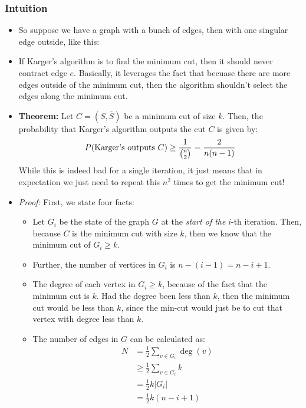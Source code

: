\subsubsection{Intuition}
\begin{itemize}
	\item So suppose we have a graph with a bunch of edges, then with one singular edge outside, like this:
	\item If Karger's algorithm is to find the minimum cut, then it should never contract edge \( e \). Basically, it leverages
		 the fact that becuase there are more edges outside of the minimum cut, then the algorithm shouldn't select the edges 
		 along the minimum cut. 
	 \item \textbf{Theorem:} Let  \( C = (S, \overline S) \) be a minimum cut of size \( k \). Then, the probability that 
		 Karger's algorithm outputs the cut \( C \) is given by:
		 \[
			 P(\text{Karger's outputs \( C \)}) \ge \frac{1}{{n \choose 2}} = \frac{2}{n(n-1)}
		 \] 
		 While this is indeed bad for a single iteration, it just means that in expectation we just need to repeat this 
		 \( n^2 \) times to get the minimum cut!
	 \item \textit{Proof:} First, we state four facts:
		 \begin{itemize}
		 	\item Let \( G_i \) be the state of the graph \( G \) at the \textit{start of the} \( i \)-th iteration. Then, because 
		 \( C \) is the minimum cut with size \( k \), then we know that the minimum cut of \( G_i \ge k \). 
			\item Further, the number of vertices in \( G_i  \) is \( n - (i - 1) = n-i+1\). 
			\item The degree of each vertex in \( G_i \ge  k \), because of the fact that the minimum cut is \( k \). Had 
				the degree been less than \( k \), then the minimum cut would be less than \( k \), since the min-cut 
				would just be to cut that vertex with degree less than \( k \). 
			\item The number of edges in \( G \) can be calculated as:
				\begin{align*}
					N &= \frac{1}{2}\sum_{v \in G_i} \deg(v)\\
					  &\ge \frac{1}{2}\sum_{v \in G_i} k\\
					  &= \frac{1}{2}k |G_i| \\
					  &= \frac{1}{2}k(n-i+1) 
				\end{align*}
		 \end{itemize}

\end{itemize}
